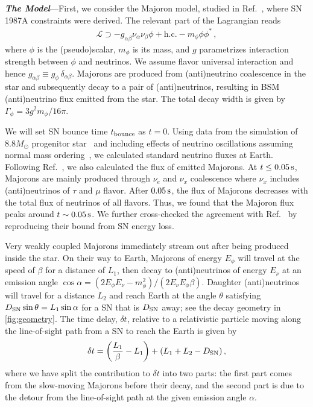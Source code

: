 \documentclass[aps,twocolumn,prl,showpacs,showkeys,preprintnumbers,superscriptaddress,nobibnotes,floatfix,longbibliography,notitlepage,nofootinbib]{revtex4-2}
\begin{document}
\textbf{\textit{The Model}}---First, we consider the Majoron model, studied in Ref.~\cite{Fiorillo:2022cdq}, where SN 1987A constraints were derived.
The relevant part of the Lagrangian reads
\begin{align}
\mathcal{L} \supset -g_{\alpha\beta} \nu_\alpha \nu_\beta \phi + \text{h.c.} - m_\phi \phi\phi^*\,,
\end{align}
where $\phi$ is the (pseudo)scalar, $m_\phi$ is its mass, and $g$ parametrizes interaction strength between $\phi$ and neutrinos.
We assume flavor universal interaction and hence $g_{\alpha\beta}\equiv g_\phi \, \delta_{\alpha\beta}$. 
Majorons are produced from (anti)neutrino coalescence in the star and subsequently decay to a pair of (anti)neutrinos, resulting in BSM (anti)neutrino flux emitted from the star.
The total decay width is given by $\Gamma_\phi = 3g^2 m_\phi/16 \pi$.

We will set SN bounce time $t_{\rm bounce}$ as $t = 0$.
Using data from the simulation of $8.8 M_\odot$ progenitor star~\cite{Huedepohl2010} and including effects of neutrino oscillations assuming normal mass ordering~\cite{Dighe:1999bi}, we calculated standard neutrino fluxes at Earth. Following Ref.~\cite{Fiorillo:2022cdq}, we also calculated the flux of emitted Majorons.
At $t \leq \unit[0.05]{s}$, Majorons are mainly produced through $\nu_e$ and $\nu_x$ coalescence where $\nu_x$ includes (anti)neutrinos of $\tau$ and $\mu$ flavor.
After $\unit[0.05]{s}$, the flux of Majorons decreases with the total flux of neutrinos of all flavors.
Thus, we found that the Majoron flux peaks around $t \sim \unit[0.05]{s}$.
We further cross-checked the agreement with Ref.~\cite{Fiorillo:2022cdq} by reproducing their bound from SN energy loss. 


Very weakly coupled Majorons immediately stream out after being produced inside the star.
On their way to Earth, Majorons of energy $E_\phi$ will travel at the speed of $\beta$ for a distance of $L_1$, then decay to (anti)neutrinos of energy $E_\nu$ at an emission angle $\cos\alpha = (2 E_\phi E_{\nu} - m^2_\phi)/(2E_{\nu}E_\phi\beta)$.
Daughter (anti)neutrinos will travel for a distance $L_2$ and reach Earth at the angle $\theta$ satisfying $D_{\rm SN} \sin\theta = L_1 \sin\alpha$ for a SN that is $D_{\rm SN}$ away; see the decay geometry in \cref{fig:geometry}.
The time delay, $\delta t$, relative to a relativistic particle moving along the line-of-sight path from a SN to reach the Earth is given by~\cite{Jaeckel:2017tud}
\begin{align}
    \delta t = \left(\frac{L_1}{\beta}-L_1\right) + (L_1 + L_2 -D_{\rm SN})\,,
    \label{eq:deltatexa}
\end{align}
where we have split the contribution to $\delta t$ into two parts: the first part comes from the slow-moving Majorons before their decay, and the second part is due to the detour from the line-of-sight path at the given emission angle $\alpha$. 
\end{document}
